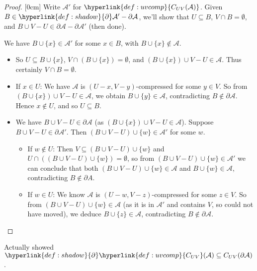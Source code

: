 \documentclass{article}
\newcommand{\A}{\mathcal{A}}
\let\subset\subseteq
\begin{document}
\begin{proof}
  [0cm]
  Write $\mathcal{A}'$ for $\hyperlink{def:uvcomp}{C_{UV}(\mathcal{A})}$.
  Given $B \in \hyperlink{def:shadow}{\partial} \A' - \partial \A$, we'll show that $U \subset B$, $V \cap B = \emptyset$, and $B \cup V - U \in \partial \A - \partial \A'$ (then done).

  We have $B \cup \{x\} \in \mathcal{A}'$ for some $x \in B$, with $B \cup \{x\} \notin \mathcal{A}$.
  \begin{itemize}
    \item So $U \subset B \cup \{x\}$, $V \cap (B \cup \{x\}) = \emptyset$, and $(B \cup \{x\}) \cup V - U \in \mathcal{A}$.
      Thus certainly $V \cap B = \emptyset$.

    \item If $x \in U$: We have $\mathcal{A}$ is $(U-x,V-y)$-compressed for some $y \in V$.
      So from $(B \cup \{x\}) \cup V - U \in \mathcal{A}$, we obtain $B \cup \{y\} \in \mathcal{A}$,
      contradicting $B \notin \partial \mathcal{A}$.
      Hence $x \notin U$, and so $U \subset B$.
    \item We have $B \cup V - U \in \partial \mathcal{A}$ (as $(B \cup \{x\}) \cup V - U \in \mathcal{A}$).
      Suppose $B \cup V - U \in \partial \mathcal{A}'$.
      Then $(B \cup V - U) \cup \{w\} \in \mathcal{A}'$ for some $w$.

      \begin{itemize}
        \item If $w \notin U$: Then $V \subset (B \cup V - U) \cup \{w\}$ and $U \cap ((B \cup V - U) \cup \{w\}) = \emptyset$, so from $(B \cup V - U) \cup \{w\} \in \mathcal{A}'$ we can conclude that both $(B \cup V - U) \cup \{w\} \in \mathcal{A}$ and $B \cup \{w\} \in \mathcal{A}$, contradicting $B \notin \partial A.$

        \item If $w \in U$: We know $\mathcal{A}$ is $(U-w,V-z)$-compressed for some $z \in V$.
          So from $(B \cup V - U) \cup \{w\} \in \mathcal{A}$ (as it is in $\mathcal{A}'$ and contains $V$, so could not have moved),
          we deduce $B \cup \{z\} \in \mathcal{A}$, contradicting $B \notin \partial \mathcal{A}$. \qedhere
      \end{itemize}
  \end{itemize}
\end{proof}
\begin{remark}
  Actually showed $\hyperlink{def:shadow}{\partial} \hyperlink{def:uvcomp}{C_{UV}}(\mathcal{A}) \subseteq C_{UV}(\partial\mathcal{A})$.
\end{remark}
\end{document}
